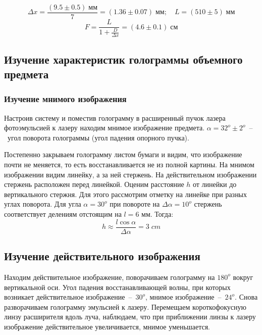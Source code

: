         \[ \Delta x = \frac{(9.5 \pm 0.5) \; мм}{7} = (1.36\pm 0.07) \; мм   ; \quad L = (510 \pm 5) \; мм \]
        \[ F = \dfrac{L}{1+\frac{D}{\Delta x}} = (4.6 \pm 0.1) \; см \]
        
\subsection{Изучение характеристик голограммы объемного предмета}
    \subsubsection*{Изучение мнимого изображения}
        
        \noindent Настроив систему и поместив голограмму в расширенный пучок лазера фотоэмульсией к лазеру находим мнимое изображение предмета. 
        $ \alpha = 32^o \pm 2^o $~--~угол поворота голограммы (угол падения опорного пучка).
        
        Постепенно закрываем голограмму листом бумаги и видим, что изображение почти не меняется, то есть восстанавливается не из полной картины.        
        На мнимом изображении видим линейку, а за ней стержень. На действительном изображении стержень расположен перед линейкой. 
        Оценим расстояние $h$ от линейки до вертикального стержня. Для этого рассмотрим отметку на линейке при разных углах поворота. Для угла $\alpha = 30^o$ при повороте на $\Delta \alpha =  10^o$ стержень соответствует делениям отстоящим на $l = 6$ мм. Тогда: \[h \approx \frac{l \cos \alpha}{\Delta \alpha} = 3 \; cm \]

    \subsection{Изучение действительного изображения}

        Находим действительное изображение, поворачиваем голограмму на $180^o$ вокруг вертикальной оси.
        Угол падения восстанавливающей волны, при которых возникает действительное изображение~--~$30^o$, мнимое изображение~--~$24^o$.
        Снова разворачиваем голограмму эмульсией к лазеру. Перемещаем короткофокусную линзу расширителя вдоль луча, наблюдаем, что при приближении линзы к лазеру изображение действительное увеличивается, мнимое уменьшается.
